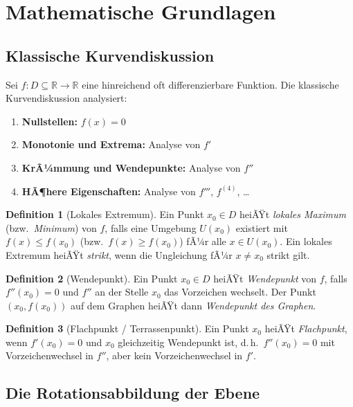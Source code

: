 ﻿\documentclass[12pt, a4paper]{article}
\theoremstyle{definition}
\newtheorem{definition}{Definition}[section]
\begin{document}
	\section{Mathematische Grundlagen}
	
	\subsection{Klassische Kurvendiskussion}
	
	Sei $f: D \subseteq \mathbb{R} \to \mathbb{R}$ eine hinreichend oft
	differenzierbare Funktion. Die klassische Kurvendiskussion analysiert:
	
	\begin{enumerate}[label=\arabic*.]
		\item \textbf{Nullstellen:} $f(x) = 0$
		\item \textbf{Monotonie und Extrema:} Analyse von $f'$
		\item \textbf{KrÃ¼mmung und Wendepunkte:} Analyse von $f''$
		\item \textbf{HÃ¶here Eigenschaften:} Analyse von $f'''$, $f^{(4)}$, \ldots
	\end{enumerate}
	
	\begin{definition}[Lokales Extremum]
		Ein Punkt $x_0 \in D$ heiÃŸt \emph{lokales Maximum} (bzw.\ \emph{Minimum})
		von $f$, falls eine Umgebung $U(x_0)$ existiert mit
		$f(x) \leq f(x_0)$ (bzw.\ $f(x) \geq f(x_0)$) fÃ¼r alle $x \in U(x_0)$.
		Ein lokales Extremum heiÃŸt \emph{strikt}, wenn die Ungleichung fÃ¼r
		$x \neq x_0$ strikt gilt.
	\end{definition}
	
	\begin{definition}[Wendepunkt]
		Ein Punkt $x_0 \in D$ heiÃŸt \emph{Wendepunkt} von $f$, falls $f''(x_0) = 0$
		und $f''$ an der Stelle $x_0$ das Vorzeichen wechselt. Der Punkt
		$(x_0, f(x_0))$ auf dem Graphen heiÃŸt dann \emph{Wendepunkt des Graphen}.
	\end{definition}
	
	\begin{definition}[Flachpunkt / Terrassenpunkt]
		Ein Punkt $x_0$ heiÃŸt \emph{Flachpunkt}, wenn $f'(x_0) = 0$ und $x_0$
		gleichzeitig Wendepunkt ist, d.\,h.\ $f''(x_0) = 0$ mit Vorzeichenwechsel
		in $f''$, aber kein Vorzeichenwechsel in $f'$.
	\end{definition}
	
	\subsection{Die Rotationsabbildung der Ebene}
	
\end{document}
